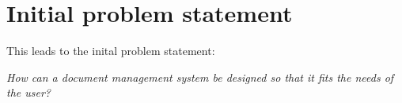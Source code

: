 \section{Initial problem statement}
This leads to the inital problem statement:

\begin{center}
\textit{How can a document management system be designed so that it fits the needs of the user?}
\end{center}
